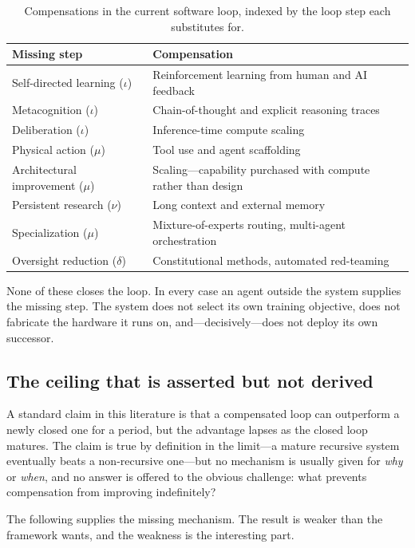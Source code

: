 \documentclass[11pt]{article}
\begin{document}
\begin{table}[h]
\centering
\footnotesize
\begin{tabular}{@{}L{5.2cm}L{7.6cm}@{}}
\toprule
Missing step & Compensation \\
\midrule
Self-directed learning ($\iota$)   & Reinforcement learning from human and AI feedback \\
Metacognition ($\iota$)            & Chain-of-thought and explicit reasoning traces \\
Deliberation ($\iota$)             & Inference-time compute scaling \\
Physical action ($\mu$)            & Tool use and agent scaffolding \\
Architectural improvement ($\mu$)  & Scaling---capability purchased with compute rather than design \\
Persistent research ($\nu$)        & Long context and external memory \\
Specialization ($\mu$)             & Mixture-of-experts routing, multi-agent orchestration \\
Oversight reduction ($\delta$)     & Constitutional methods, automated red-teaming \\
\bottomrule
\end{tabular}
\caption{Compensations in the current software loop, indexed by the loop step each substitutes for.}
\end{table}

None of these closes the loop. In every case an agent outside the system supplies the missing step. The system does not select its own training objective, does not fabricate the hardware it runs on, and---decisively---does not deploy its own successor.

\subsection{The ceiling that is asserted but not derived}

A standard claim in this literature is that a compensated loop can outperform a newly closed one for a period, but the advantage lapses as the closed loop matures. The claim is true by definition in the limit---a mature recursive system eventually beats a non-recursive one---but no mechanism is usually given for \emph{why} or \emph{when}, and no answer is offered to the obvious challenge: what prevents compensation from improving indefinitely?

The following supplies the missing mechanism. The result is weaker than the framework wants, and the weakness is the interesting part.
\end{document}
